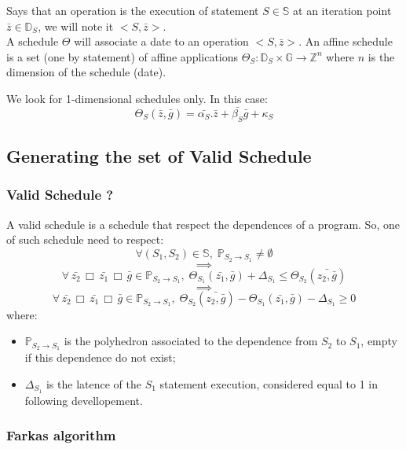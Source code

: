 	Says  that an operation is the execution of statement $S \in \mathbb{S}$ at an iteration point 
$\bar{z} \in \mathbb{D}_{S}$, we will note it $<\!S, \bar{z}\!>$.\\
	A schedule $\Theta$ will associate a date to an operation $<\!S, \bar{z}\!>$. An affine schedule is a set (one
by statement) of affine applications $\Theta_{S}: \mathbb{D}_{S} \times \mathbb{G} \rightarrow \mathbb{Z}^{n}$ where $n$
is the dimension of the schedule (date).

	We look for 1-dimensional schedules only. In this case:
$$\Theta_{S}(\bar{z}, \bar{g}) = \bar{\alpha_{S}} . \bar{z} + \bar{\beta_{S}} \bar{g} + \kappa_{S}$$

		\subsection{Generating the set of Valid Schedule}
		\label{polyhedric:schedule:vss}

			\subsubsection{Valid Schedule ?}
			\label{polyhedric:schedule:vss:vss}
			
	A valid schedule is a schedule that respect the dependences of a program. So, one of such schedule need to respect:
	$$ \forall (S_{1}, S_{2}) \in \mathbb{S}, \; \mathbb{P}_{S_{2} \rightarrow S_{1}} \neq \emptyset $$
	$$ \implies $$
	$$ \forall \, \bar{z_{2}} \,\Box\, \bar{z_{1}} \,\Box\, \bar{g} \in \mathbb{P}_{S_{2} \rightarrow S_{1}}, \; 
	\Theta_{S_{1}}(\bar{z_{1}}, \bar{g}) + \Delta_{S_{1}} \leq \Theta_{S_{2}}(\bar{z_{2}, \bar{g}}) $$
	$$ \implies $$
	$$ \forall \, \bar{z_{2}} \,\Box\, \bar{z_{1}} \,\Box\, \bar{g} \in \mathbb{P}_{S_{2} \rightarrow S_{1}}, \; 
	\Theta_{S_{2}}(\bar{z_{2}, \bar{g}}) - \Theta_{S_{1}}(\bar{z_{1}}, \bar{g}) - \Delta_{S_{1}} \geq 0 $$
	where:
\begin{itemize}
	\item $ \mathbb{P}_{S_{2} \rightarrow S_{1}} $ is the polyhedron associated to the dependence from $S_{2}$ to $S_{1}$,
	empty if this dependence do not exist;
	\item $ \Delta_{S_{1}} $ is the latence of the $S_{1}$ statement execution, considered equal to 1 in following
	devellopement.
\end{itemize}

			\subsubsection{Farkas algorithm}
			\label{polyhedric:schedule:vss:farkas}

